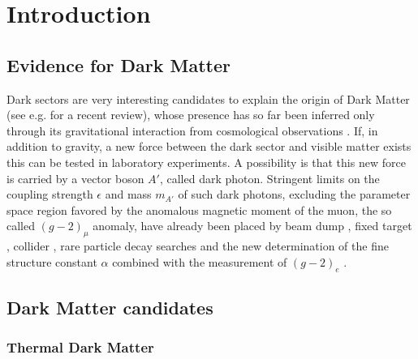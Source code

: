 

\chapter{Introduction} %

\label{chapter6}


\section{Evidence for Dark Matter}
\label{ch1:sec:dm-evidence}

Dark sectors are very interesting candidates to explain the origin of Dark Matter (see e.g. \cite{mb} for a recent review), whose presence has 
so far been inferred only through its gravitational interaction from cosmological observations \cite{hooper}. 
If, in addition to gravity, a new force between the dark sector and visible matter exists \cite{prw, pospelov} this can be tested in laboratory experiments. A possibility is that this new force is carried by a vector boson $A'$, called dark photon.
Stringent limits on the coupling strength $\epsilon$ and mass $m_{A'}$ of such dark photons, excluding the parameter space region favored by the anomalous magnetic moment of the muon, the so called $(g-2)_{\mu}$ anomaly, have already been placed by beam dump \cite{jdb, charm, rio, e137, konaka, bross, dav,  ath, nomad, e787, essig1, blum,sg1, blum1, sarah1}, fixed target \cite{apex,merkel,merkel1}, collider \cite{babar, curt, babar1}, rare particle decay searches \cite{sindrum, kloe, sg2, kloe2, wasa, hades, phenix, e949, na48, pol, kloe3} and the new determination of the fine structure constant $\alpha$ combined with the measurement of $(g-2)_e$ \cite{Parker191,PhysRevLett.100.120801}. 

\section{Dark Matter candidates}
\label{ch1:sec:dm-candidates}

\subsection{Thermal Dark Matter}
\label{ch1:sec:dm-thermal}

